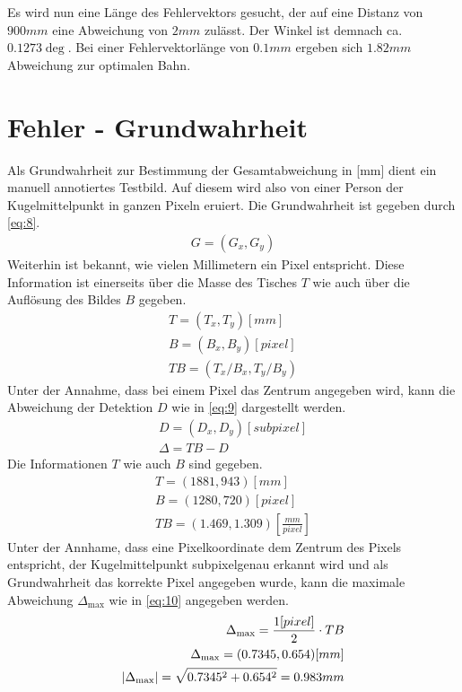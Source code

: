 Es wird nun eine Länge des Fehlervektors gesucht, der auf eine Distanz von $900mm$ eine Abweichung von $2mm$ zulässt.
Der Winkel ist demnach ca. $0.1273\deg$. Bei einer Fehlervektorlänge von $0.1mm$ ergeben sich $1.82mm$ Abweichung zur
optimalen Bahn.

\section{Fehler - Grundwahrheit}\label{anhang:fehler:grundwahrheit}
Als Grundwahrheit zur Bestimmung der Gesamtabweichung in [mm] dient ein manuell annotiertes Testbild.
Auf diesem wird also von einer Person der Kugelmittelpunkt in ganzen Pixeln eruiert. Die Grundwahrheit
ist gegeben durch \ref{eq:8}.
\begin{align}
    G = (G_x, G_y)\label{eq:8}
\end{align}
Weiterhin ist bekannt, wie vielen Millimetern ein Pixel entspricht. Diese Information ist einerseits über die Masse des
Tisches $T$ wie auch über die Auflösung des Bildes $B$ gegeben.
\begin{align}
    T = (T_x, T_y) [mm]\\
    B = (B_x, B_y) [pixel]\\
    TB = (T_x/B_x, T_y/B_y)
\end{align}
Unter der Annahme, dass bei einem Pixel das Zentrum angegeben wird, kann die Abweichung der Detektion $D$ wie in \ref{eq:9}
dargestellt werden.
\begin{align}
    D = (D_x, D_y) [subpixel]\\
    \Delta = TB - D\label{eq:9}
\end{align}
Die Informationen $T$ wie auch $B$ sind gegeben.
\begin{align}
    T = (1881, 943) [mm]\\
    B = (1280, 720) [pixel]\\
    TB = (1.469, 1.309) [\frac{mm}{pixel}]
\end{align}
Unter der Annhame, dass eine Pixelkoordinate dem Zentrum des Pixels entspricht, der Kugelmittelpunkt
subpixelgenau erkannt wird und als Grundwahrheit das korrekte Pixel angegeben wurde, kann die
maximale Abweichung $\Delta_{\max}$ wie in \ref{eq:10} angegeben werden.
\begin{align}
    \Delta_{\max} = \frac{1 [pixel]}{2} \cdot TB\label{eq:10}\\
    \Delta_{\max} = (0.7345, 0.654) [mm]\\
    \lvert \Delta_{\max} \rvert = \sqrt{0.7345^2 +  0.654^2} = 0.983 mm
\end{align}
